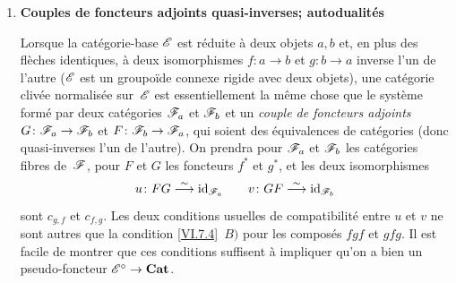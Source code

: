 \begin{enumerate}
\medskip
\item[d)] \textbf{Couples de foncteurs adjoints quasi-inverses;
autodualités}

Lorsque la cat\'egorie-base $\cal{E}$ est r\'eduite \`a deux
objets $a,b$ et, en plus des fl\`eches identiques, \`a deux
isomorphismes $f\colon a\to b$ et $g\colon b\to a$ inverse l'un de
l'autre (\ie $\cal{E}$ est un groupo\"ide connexe rigide avec deux
objets), une cat\'egorie cliv\'ee normalis\'ee sur~$\cal{E}$ est
essentiellement la m\^eme chose que le syst\`eme form\'e par
deux cat\'egories $\cal{F}_a$ et $\cal{F}_b$ et un \emph{couple de
foncteurs adjoints} $G\colon \cal{F}_a\to\cal{F}_b$ et $F\colon
\cal{F}_b\to\cal{F}_a$, qui soient des \'equivalences de
cat\'egories (donc quasi-inverses l'un de l'autre). On prendra pour
$\cal{F}_a$ et $\cal{F}_b$ les cat\'egories fibres de~$\cal{F}$,
pour $F$ et $G$ les foncteurs $f^*$ et $g^*$, et les deux
isomorphismes
$$
u\colon FG\isomto\id_{\cal{F}_a}\qquad v\colon
GF\isomto\id_{\cal{F}_b}
$$
sont $c_{g,f}$ et $c_{f,g}$. Les deux conditions usuelles de
compatibilit\'e entre $u$ et $v$ ne sont autres que la condition
\ref{VI.7.4}~$B)$ pour les compos\'es $fgf$ et $gfg$. Il est facile
de montrer que ces conditions suffisent \`a impliquer qu'on a bien
un pseudo-foncteur $\cal{E}^\circ\to\Cat$.


\end{enumerate}
